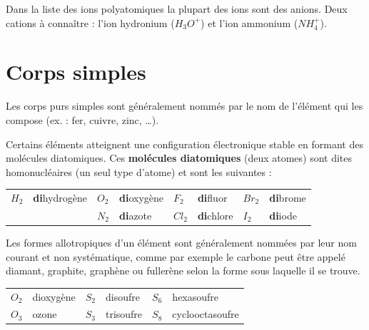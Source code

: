 \documentclass[
  11pt,
  a4paper,
  openany]{book}
\begin{document}
Dans la liste des ions polyatomiques la plupart des ions sont des anions. Deux cations à connaître : l'ion hydronium (\(H_3O^+\)) et l'ion ammonium (\(NH_4^+\)).

\hypertarget{corps-simples}{%
\section{Corps simples}\label{corps-simples}}

Les corps purs simples sont généralement nommés par le nom de l'élément qui les compose (ex. : fer, cuivre, zinc, \ldots).

Certains éléments atteignent une configuration électronique stable en formant des molécules diatomiques. Ces \textbf{molécules diatomiques} (deux atomes) sont dites homonucléaires (un seul type d'atome) et sont les suivantes :

\begin{longtable}[]{@{}
  >{\centering\arraybackslash}p{}
  >{\raggedright\arraybackslash}p{}
  >{\centering\arraybackslash}p{}
  >{\raggedright\arraybackslash}p{}
  >{\centering\arraybackslash}p{}
  >{\raggedright\arraybackslash}p{}
  >{\centering\arraybackslash}p{}
  >{\raggedright\arraybackslash}p{}@{}}
\toprule()
\endhead
\(H_2\) & \textbf{di}hydrogène & \(O_2\) & \textbf{di}oxygène & \(F_2\) & \textbf{di}fluor & \(Br_2\) & \textbf{di}brome \\
& & \(N_2\) & \textbf{di}azote & \(Cl_2\) & \textbf{di}chlore & \(I_2\) & \textbf{di}iode \\
\bottomrule()
\end{longtable}

Les formes allotropiques d'un élément sont généralement nommées par leur nom courant et non systématique, comme par exemple le carbone peut être appelé diamant, graphite, graphène ou fullerène selon la forme sous laquelle il se trouve.

\begin{longtable}[]{@{}clclcl@{}}
\toprule()
\endhead
\(O_2\) & dioxygène & \(S_2\) & disoufre & \(S_6\) & hexasoufre \\
\(O_3\) & ozone & \(S_3\) & trisoufre & \(S_8\) & cyclooctasoufre \\
\bottomrule()
\end{longtable}
\end{document}
